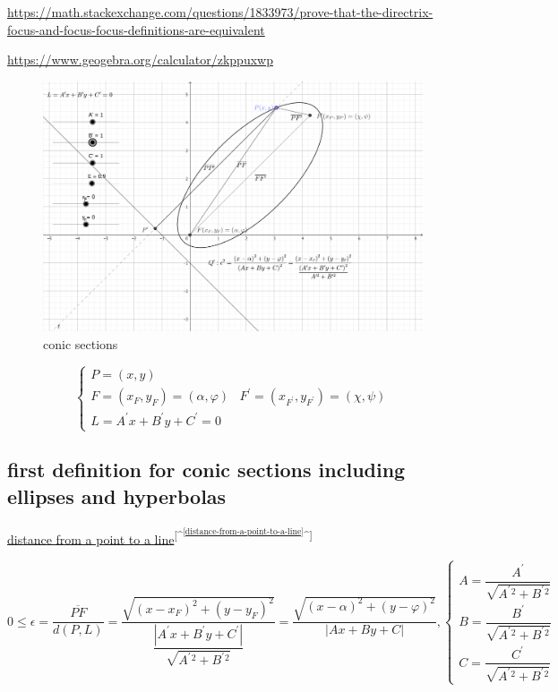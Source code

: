 \documentclass[
]{book}
\theoremstyle{definition}
\theoremstyle{definition}
\theoremstyle{definition}
\theoremstyle{definition}
\theoremstyle{remark}
\begin{document}
\url{https://math.stackexchange.com/questions/1833973/prove-that-the-directrix-focus-and-focus-focus-definitions-are-equivalent}

\url{https://www.geogebra.org/calculator/zkppuxwp}

\begin{figure}
\includegraphics[width=0.75\linewidth]{img/conic-sections} \caption{conic sections}\label{fig:unnamed-chunk-3}
\end{figure}

\[
\begin{cases}
P=\left(x,y\right)\\
F=\left(x_{{\scriptscriptstyle F}},y_{{\scriptscriptstyle F}}\right)=\left(\alpha,\varphi\right) & F^{\prime}=\left(x_{{\scriptscriptstyle F^{\prime}}},y_{{\scriptscriptstyle F^{\prime}}}\right)=\left(\chi,\psi\right)\\
L=A^{\prime}x+B^{\prime}y+C^{\prime}=0
\end{cases}
\]

\subsection{first definition for conic sections including ellipses and hyperbolas}\label{first-definition-for-conic-sections-including-ellipses-and-hyperbolas}

\hyperref[distance-from-a-point-to-a-line]{distance from a point to a line}\textsuperscript{{[}\^{}\textsuperscript{\ref{distance-from-a-point-to-a-line}}\^{}{]}}

\[
0\le\epsilon=\dfrac{\overline{PF}}{d\left(P,L\right)}=\dfrac{\sqrt{\left(x-x_{{\scriptscriptstyle F}}\right)^{2}+\left(y-y_{{\scriptscriptstyle F}}\right)^{2}}}{\dfrac{\left|A^{\prime}x+B^{\prime}y+C^{\prime}\right|}{\sqrt{A^{\prime}{}^{2}+B^{\prime}{}^{2}}}}=\dfrac{\sqrt{\left(x-\alpha\right)^{2}+\left(y-\varphi\right)^{2}}}{\left|Ax+By+C\right|},\begin{cases}
A=\dfrac{A^{\prime}}{\sqrt{A^{\prime}{}^{2}+B^{\prime}{}^{2}}}\\
B=\dfrac{B^{\prime}}{\sqrt{A^{\prime}{}^{2}+B^{\prime}{}^{2}}}\\
C=\dfrac{C^{\prime}}{\sqrt{A^{\prime}{}^{2}+B^{\prime}{}^{2}}}
\end{cases}
\]
\end{document}
